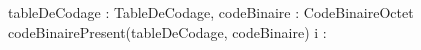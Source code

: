 \begin{algorithme}
        {tableDeCodage : TableDeCodage, codeBinaire : CodeBinaire}{Octet}
        {codeBinairePresent(tableDeCodage, codeBinaire)}
        {i : \naturelNonNul}
    {
    }


\end{algorithme}
